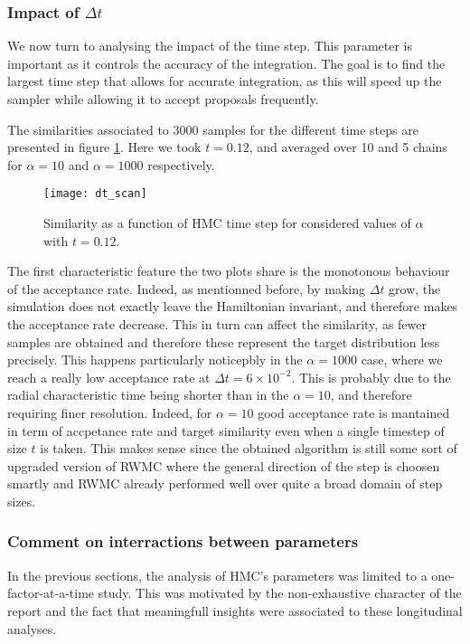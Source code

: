 \documentclass[a4paper, 12pt,oneside]{article}
\begin{document}
			\subsubsection{Impact of $\Delta t$}
			We now turn to analysing the impact of the time step. This parameter is important as it controls the accuracy of the integration. The goal is to find the largest time step that allows for accurate integration, as this will speed up the sampler while allowing it to accept proposals frequently.

			The similarities associated to 3000 samples for the different time steps are presented in figure \ref{fig:dt-scan}. Here we took $t=0.12$, and averaged over 10 and 5 chains for $\alpha=10$ and $\alpha=1000$ respectively. 
			\begin{figure}[htb]
				\centering
					\vspace{0em}
					\texttt{[image: dt\_scan]}
					\caption{Similarity as a function of HMC time step for considered values of $\alpha$ with $t=0.12$.}
					\label{fig:dt-scan}
			\end{figure}
			The first characteristic feature the two plots share is the monotonous behaviour of the acceptance rate. Indeed, as mentionned before, by making $\Delta t$ grow, the simulation does not exactly leave the Hamiltonian invariant, and therefore makes the acceptance rate decrease. This in turn can affect the similarity, as fewer samples are obtained and therefore these represent the target distribution less precisely. This happens particularly noticepbly in the $\alpha=1000$ case, where we reach a really low acceptance rate at $\Delta t=6\times 10^{-2}$. This is probably due to the radial characteristic time being shorter than in the $\alpha=10$, and therefore requiring finer resolution. Indeed, for $\alpha=10$ good acceptance rate is mantained in term of accpetance rate and target similarity even when a single timestep of size $t$ is taken. This makes sense since the obtained algorithm is still some sort of upgraded version of RWMC where the general direction of the step is choosen smartly and RWMC already performed well over quite a broad domain of step sizes.   
			\subsubsection{Comment on interractions between parameters}
			In the previous sections, the analysis of HMC's parameters was limited to a one-factor-at-a-time study. This was motivated by the non-exhaustive character of the report and the fact that meaningfull insights were associated to these longitudinal analyses. 
			
\end{document}
